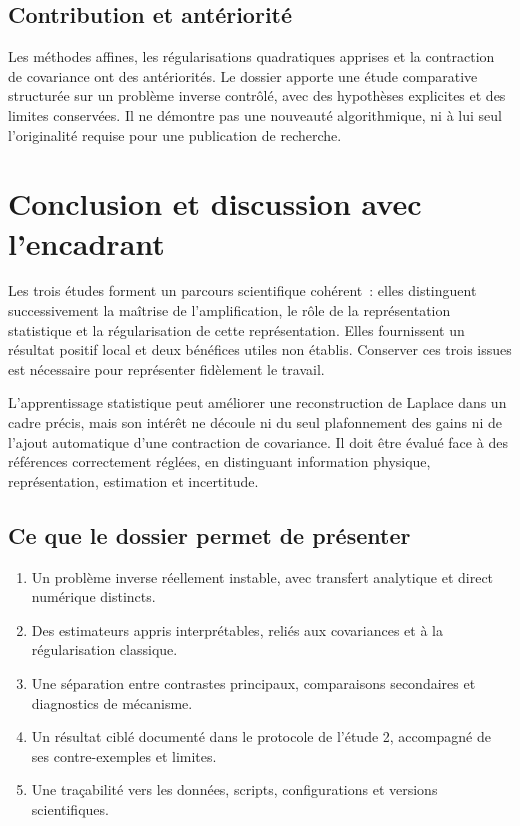 \documentclass[11pt,a4paper]{article}
\begin{document}
\subsection*{Contribution et antériorité}
Les méthodes affines, les régularisations quadratiques apprises et la contraction de covariance
ont des antériorités. Le dossier apporte une étude comparative structurée sur un problème
inverse contrôlé, avec des hypothèses explicites et des limites conservées. Il ne démontre
pas une nouveauté algorithmique, ni à lui seul l'originalité requise pour une publication de recherche.

\newpage
\section{Conclusion et discussion avec l'encadrant}
Les trois études forment un parcours scientifique cohérent~: elles distinguent successivement
la maîtrise de l'amplification, le rôle de la représentation statistique et la régularisation de
cette représentation. Elles fournissent un résultat positif local et deux bénéfices utiles non
établis. Conserver ces trois issues est nécessaire pour représenter fidèlement le travail.

\begin{keybox}
L'apprentissage statistique peut améliorer une reconstruction de Laplace dans un cadre
précis, mais son intérêt ne découle ni du seul plafonnement des gains ni de l'ajout automatique
d'une contraction de covariance. Il doit être évalué face à des références correctement réglées,
en distinguant information physique, représentation, estimation et incertitude.
\end{keybox}

\subsection*{Ce que le dossier permet de présenter}
\begin{enumerate}
\item Un problème inverse réellement instable, avec transfert analytique et direct numérique distincts.
\item Des estimateurs appris interprétables, reliés aux covariances et à la régularisation classique.
\item Une séparation entre contrastes principaux, comparaisons secondaires et diagnostics de mécanisme.
\item Un résultat ciblé documenté dans le protocole de l'étude 2, accompagné de ses contre-exemples et limites.
\item Une traçabilité vers les données, scripts, configurations et versions scientifiques.
\end{enumerate}
\end{document}
